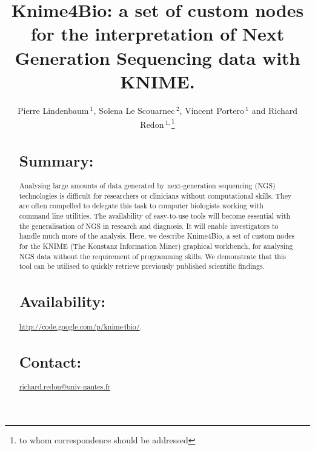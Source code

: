\documentclass{bioinfo}
\begin{document}

\title[Knime4Bio]{Knime4Bio: a set of custom nodes for the interpretation of Next Generation Sequencing data with KNIME.}
\author[Pierre Lindenbaum \textit{et~al}]{Pierre Lindenbaum\,$^{1}$, Solena Le Scouarnec\,$^{2}$,  Vincent Portero\,$^{1}$ and Richard Redon\,$^{1,}$\footnote{to whom correspondence should be addressed}}
\address{$^{1}$Institut du thorax, Inserm UMR 915, Centre Hospitalier Universitaire de Nantes, 44000 Nantes, France.\\
$^{2}$The Wellcome Trust Sanger Institute, Hinxton, Cambridge CB10 1SA, UK.}



\maketitle

\begin{abstract}

\section{Summary:}
Analysing large amounts of data generated by next-generation sequencing (NGS) technologies is difficult for researchers or clinicians without computational skills. They are often compelled to delegate this task to computer biologists working with command line utilities. The availability of easy-to-use tools will become essential with the generalisation of NGS in research and diagnosis. It will enable investigators to handle much more of the analysis. Here, we describe Knime4Bio, a set of custom nodes for the KNIME (The Konstanz Information Miner) graphical workbench, for analysing NGS data without the requirement of programming skills. We demonstrate that this tool can be utilised to quickly retrieve previously published scientific findings.

\section{Availability:}
\href{http://code.google.com/p/knime4bio/}{http://code.google.com/p/knime4bio/}.

\section{Contact:} \href{mailto:richard.redon@univ-nantes.fr}{richard.redon@univ-nantes.fr}
\end{abstract}
\end{document}
